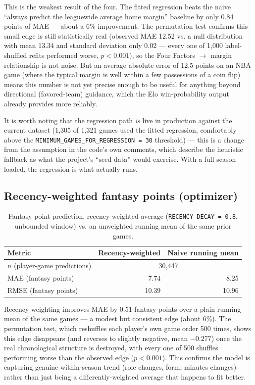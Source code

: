 \documentclass[11pt]{article}
\newcommand{\code}[1]{\allowbreak\texttt{\small #1}\allowbreak}
\begin{document}
This is the weakest result of the four. The fitted regression beats the naive ``always predict the
leaguewide average home margin'' baseline by only 0.84 points of MAE — about a 6\% improvement. The
permutation test confirms this small edge is still statistically real (observed MAE 12.52 vs. a null
distribution with mean 13.34 and standard deviation only 0.02 — every one of 1,000 label-shuffled refits
performed worse, $p < 0.001$), so the Four Factors $\to$ margin relationship is not noise. But an
average absolute error of 12.5 points on an NBA game (where the typical margin is well within a few
possessions of a coin flip) means this number is not yet precise enough to be useful for anything beyond
directional (favored-team) guidance, which the Elo win-probability output already provides more reliably.

It is worth noting that the regression path \emph{is} live in production against the current dataset (1,305
of 1,321 games used the fitted regression, comfortably above the \code{MINIMUM\_GAMES\_FOR\_REGRESSION = 30}
threshold) — this is a change from the assumption in the code's own comments, which describe the heuristic
fallback as what the project's ``seed data'' would exercise. With a full season loaded, the regression is
what actually runs.

\subsection{Recency-weighted fantasy points (optimizer)}
\label{sec:fantasy}

\begin{table}[h]
\centering
\begin{tabular}{lrr}
\toprule
Metric & Recency-weighted & Naive running mean \\
\midrule
$n$ (player-game predictions) & \multicolumn{2}{c}{30,447} \\
MAE (fantasy points) & 7.74 & 8.25 \\
RMSE (fantasy points) & 10.39 & 10.96 \\
\bottomrule
\end{tabular}
\caption{Fantasy-point prediction, recency-weighted average (\code{RECENCY\_DECAY = 0.8}, unbounded window)
vs. an unweighted running mean of the same prior games.}
\end{table}

Recency weighting improves MAE by 0.51 fantasy points over a plain running mean of the same games — a modest
but consistent edge (about 6\%). The permutation test, which reshuffles each player's own game order 500
times, shows this edge disappears (and reverses to slightly negative, mean $-0.277$) once the real
chronological structure is destroyed, with every one of 500 shuffles performing worse than the observed
edge ($p < 0.001$). This confirms the model is capturing genuine within-season trend (role changes, form,
minutes changes) rather than just being a differently-weighted average that happens to fit better.
\end{document}
